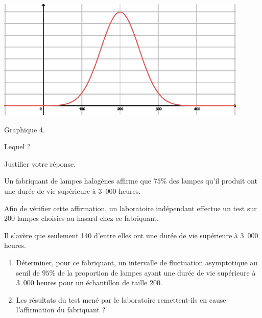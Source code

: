 \begin{enumerate}
     \begin{center}
          \begin{extern}%
               \includegraphics[width=0.9\textwidth]{images/BBESL-s5-1-4}%
          \end{extern}
     \end{center}
     \begin{center}
          Graphique 4.
     \end{center}
     \par
     Lequel ?
     \par
     Justifier votre réponse.
     \par
\end{enumerate}
\par
%
%
\par
Un fabriquant de lampes halogènes affirme que $75\%$ des lampes qu'il produit ont une durée de vie supérieure à 3\ 000 heures.
\par
Afin de vérifier cette affirmation, un laboratoire indépendant effectue un test sur 200 lampes choisies au hasard chez ce fabriquant.
\par
Il s'avère que seulement 140 d'entre elles ont une  durée de vie supérieure à 3\ 000 heures.
\par
\begin{enumerate}
     \item
     Déterminer, pour ce fabriquant, un intervalle de fluctuation asymptotique au seuil de $95\%$ de la proportion de lampes ayant une durée de vie supérieure à 3\ 000 heures pour un échantillon de taille 200.
     \item
     Les résultats du test mené par le laboratoire remettent-ils en cause l'affirmation du fabriquant ?
     \par
\end{enumerate}
